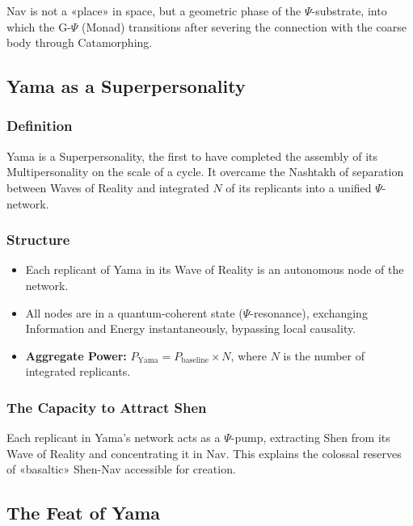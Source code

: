 \documentclass[a4paper,12pt]{article}
\begin{document}
	Nav is not a «place» in space, but a geometric phase of the $\Psi$-substrate, into which the G-$\Psi$ (Monad) transitions after severing the connection with the coarse body through Catamorphing.
	
	\subsection{Yama as a Superpersonality}
	
	\subsubsection{Definition}
	
	Yama is a Superpersonality, the first to have completed the assembly of its Multipersonality on the scale of a cycle. It overcame the Nashtakh of separation between Waves of Reality and integrated $N$ of its replicants into a unified $\Psi$-network.
	
	\subsubsection{Structure}
	
	\begin{itemize}
		\item Each replicant of Yama in its Wave of Reality is an autonomous node of the network.
		\item All nodes are in a quantum-coherent state ($\Psi$-resonance), exchanging Information and Energy instantaneously, bypassing local causality.
		\item \textbf{Aggregate Power:} $P_{\text{Yama}} = P_{\text{baseline}} \times N$, where $N$ is the number of integrated replicants.
	\end{itemize}
	
	\subsubsection{The Capacity to Attract Shen}
	
	Each replicant in Yama's network acts as a $\Psi$-pump, extracting Shen from its Wave of Reality and concentrating it in Nav. This explains the colossal reserves of «basaltic» Shen-Nav accessible for creation.
	
	\subsection{The Feat of Yama}
	
\end{document}
